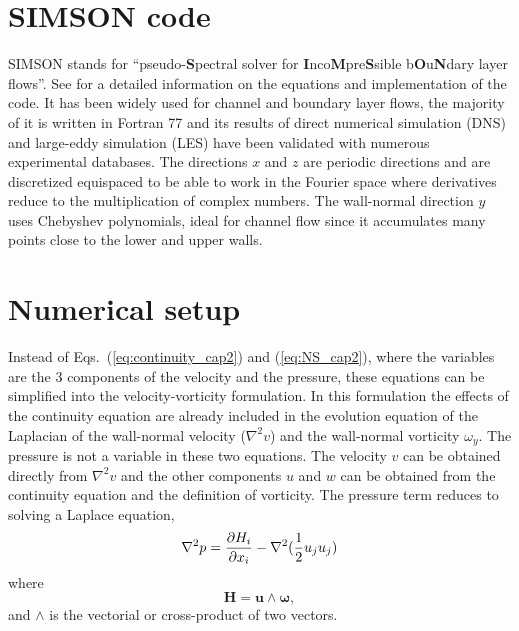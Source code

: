 \section{SIMSON code}
SIMSON stands for ``pseudo-\textbf{S}pectral solver for
\textbf{I}nco\textbf{M}pre\textbf{S}sible b\textbf{O}u\textbf{N}dary layer flows''. See \cite{simson_techrep} for a detailed information on the equations and implementation of the code.
It has been widely used for channel and boundary layer flows, the majority of it is written in Fortran 77 and its results of direct numerical simulation (DNS) and large-eddy simulation (LES) have been validated with numerous experimental databases.
The directions $x$ and $z$ are periodic directions and are discretized equispaced to be able to work in the Fourier space where derivatives reduce to the multiplication of complex numbers.
The wall-normal direction $y$ uses Chebyshev polynomials, ideal for channel flow since it accumulates many points close to the lower and upper walls. 




\section{Numerical setup} \label{sec:NumSetUp}
Instead of Eqs.~(\ref{eq:continuity_cap2}) and (\ref{eq:NS_cap2}), where the variables are the 3 components of the velocity and the pressure, these equations can be simplified into the 
velocity-vorticity formulation. In this formulation the effects of the continuity equation are already included in the evolution equation of the Laplacian of the wall-normal velocity ($\nabla^2 v$) and the wall-normal vorticity $\omega_y$. The pressure is not a variable in these two equations. The velocity $v$ can be obtained directly from $\nabla^2 v$ and the other components $u$ and $w$ can be obtained from the continuity equation and the definition of vorticity.
The pressure term reduces to solving a Laplace equation,
\begin{equation}
    \nabla^2 p = \pdv{H_i}{x_i} - \nabla^2 (\frac{1}{2} u_j u_j)
\end{equation}
where
\begin{equation}
    \pmb{H} = \pmb{u} \land \pmb{\omega },
\end{equation}
and $\land$ is the vectorial or cross-product of two vectors. 

